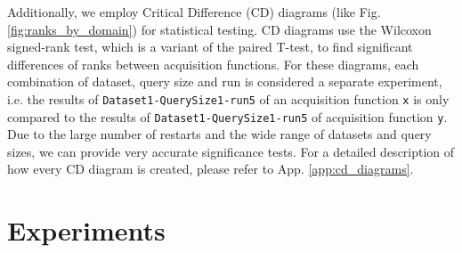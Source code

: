 \documentclass[]{article}
\begin{document}
Additionally, we employ Critical Difference (CD) diagrams (like Fig. \ref{fig:ranks_by_domain}) for statistical testing.
CD diagrams use the Wilcoxon signed-rank test, which is a variant of the paired T-test, to find significant differences of ranks between acquisition functions.
For these diagrams, each combination of dataset, query size and run is considered a separate experiment, i.e. the results of \verb|Dataset1-QuerySize1-run5| of an acquisition function \verb|x| is only compared to the results of \verb|Dataset1-QuerySize1-run5| of acquisition function \verb|y|.
Due to the large number of restarts and the wide range of datasets and query sizes, we can provide very accurate significance tests.
For a detailed description of how every CD diagram is created, please refer to App. \ref{app:cd_diagrams}.


\section{Experiments}
\end{document}
